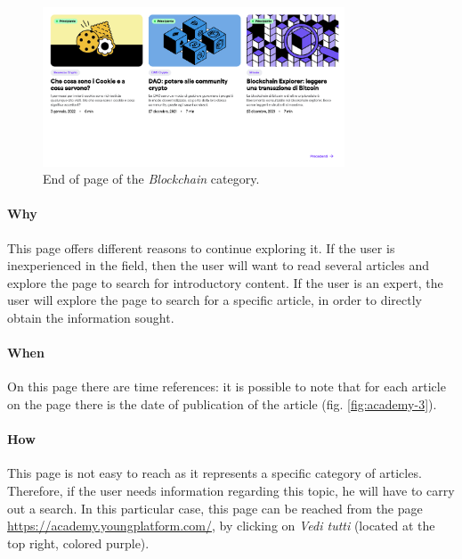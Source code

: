 \begin{figure}[H]
  \centering
  \includegraphics[width=0.80\textwidth]{res/images/internal-pages/academy/academy-4.png}
  \caption{End of page of the \textit{Blockchain} category.}
  \label{fig:academy-4}
\end{figure}

\paragraph{Why}

This page offers different reasons to continue exploring it. If the user 
is inexperienced in the field, then the user will want to read several 
articles and explore the page to search for introductory content. If the 
user is an expert, the user will explore the page to search for a specific 
article, in order to directly obtain the information sought.

\paragraph{When}

On this page there are time references: it is possible to note that for 
each article on the page there is the date of publication of the article 
(fig. \ref{fig:academy-3}).

\paragraph{How}

This page is not easy to reach as it represents a specific category of 
articles. Therefore, if the user needs information regarding this topic, 
he will have to carry out a search. In this particular case, this page can 
be reached from the page 
\href{https://academy.youngplatform.com/}{https://academy.youngplatform.com/}, 
by clicking on \textit{Vedi tutti} (located at the top right, colored 
purple).

